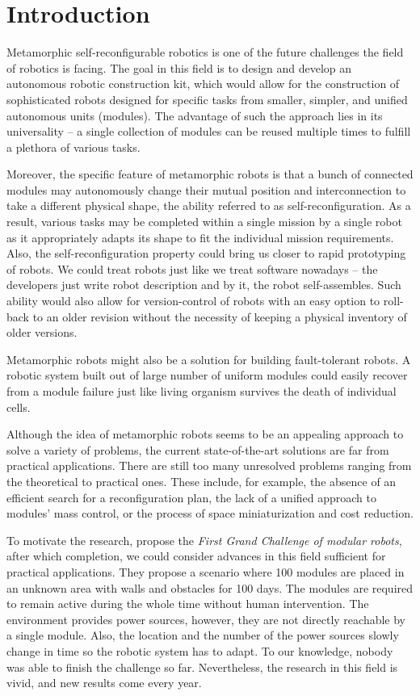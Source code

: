 \chapter{Introduction}\label{chap:introduciton}

Metamorphic self-reconfigurable robotics is one of the future challenges the
field of robotics is facing. The goal in this field is to design and develop an
autonomous robotic construction kit, which would allow for the construction of
sophisticated robots designed for specific tasks from smaller, simpler, and
unified autonomous units (modules). The advantage of such the approach lies in
its universality -- a single collection of modules can be reused multiple times
to fulfill a plethora of various tasks.

Moreover, the specific feature of metamorphic robots is that a bunch of
connected modules may autonomously change their mutual position and
interconnection to take a different physical shape, the ability referred to as
self-reconfiguration. As a result, various tasks may be completed within a
single mission by a single robot as it appropriately adapts its shape to fit the
individual mission requirements. Also, the self-reconfiguration property could
bring us closer to rapid prototyping of robots. We could treat robots just like
we treat software nowadays -- the developers just write robot description and by
 it, the robot self-assembles. Such ability would also allow for
version-control of robots with an easy option to roll-back to an older revision
without the necessity of keeping a physical inventory of older versions.

Metamorphic robots might also be a solution for building fault-tolerant robots.
A robotic system built out of large number of uniform modules could easily
recover from a module failure just like living organism survives the death of
individual cells.

Although the idea of metamorphic robots seems to be an appealing approach to
solve a variety of problems, the current state-of-the-art solutions are far from
practical applications. There are still too many unresolved problems ranging
from the theoretical to practical ones. These include, for example, the absence
of an efficient search for a reconfiguration plan, the lack of a unified
approach to modules' mass control, or the process of space miniaturization and
cost reduction.

To motivate the research, \textcite{DBLP:journals/corr/abs-1108-5543} propose
the \emph{First Grand Challenge of modular robots}, after which completion, we
could consider advances in this field sufficient for practical applications.
They propose a scenario where 100 modules are placed in an unknown area with
walls and obstacles for 100 days. The modules are required to remain active
during the whole time without human intervention. The environment provides power
sources, however, they are not directly reachable by a single module. Also, the
location and the number of the power sources slowly change in time so the
robotic system has to adapt. To our knowledge, nobody was able to finish the
challenge so far. Nevertheless, the research in this field is vivid, and new
results come every year.

